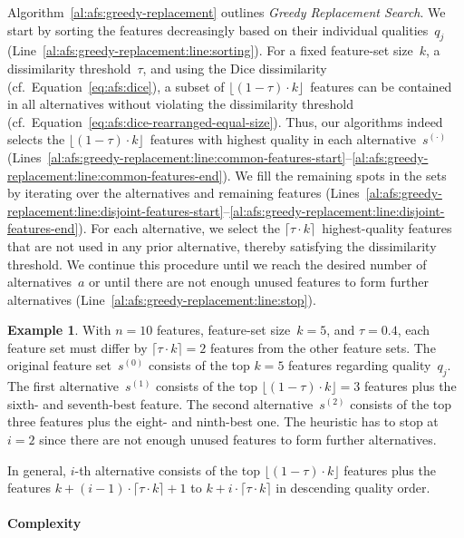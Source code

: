 \documentclass{article}
\theoremstyle{definition}
\newtheorem{example}{Example}
\begin{document}
Algorithm~\ref{al:afs:greedy-replacement} outlines \emph{Greedy Replacement Search}.
We start by sorting the features decreasingly based on their individual qualities~$q_j$ (Line~\ref{al:afs:greedy-replacement:line:sorting}).
For a fixed feature-set size~$k$, a dissimilarity threshold~$\tau$, and using the Dice dissimilarity (cf.~Equation~\ref{eq:afs:dice}), a subset of $\lfloor (1 - \tau) \cdot k \rfloor$~features can be contained in all alternatives without violating the dissimilarity threshold (cf.~Equation~\ref{eq:afs:dice-rearranged-equal-size}).
Thus, our algorithms indeed selects the $\lfloor (1 - \tau) \cdot k \rfloor$~features with highest quality in each alternative~$s^{(\cdot)}$ (Lines~\ref{al:afs:greedy-replacement:line:common-features-start}--\ref{al:afs:greedy-replacement:line:common-features-end}).
We fill the remaining spots in the sets by iterating over the alternatives and remaining features (Lines~\ref{al:afs:greedy-replacement:line:disjoint-features-start}--\ref{al:afs:greedy-replacement:line:disjoint-features-end}).
For each alternative, we select the $\lceil \tau \cdot k \rceil$~highest-quality features that are not used in any prior alternative, thereby satisfying the dissimilarity threshold.
We continue this procedure until we reach the desired number of alternatives~$a$ or until there are not enough unused features to form further alternatives (Line~\ref{al:afs:greedy-replacement:line:stop}).
%
\begin{example}
With $n=10$ features, feature-set size~$k=5$, and $\tau=0.4$, each feature set must differ by $\lceil \tau \cdot k \rceil = 2$ features from the other feature sets.
The original feature set~$s^{(0)}$ consists of the top $k=5$ features regarding quality~$q_j$.
The first alternative~$s^{(1)}$ consists of the top $\lfloor (1 - \tau) \cdot k \rfloor = 3$ features plus the sixth- and seventh-best feature.
The second alternative~$s^{(2)}$ consists of the top three features plus the eight- and ninth-best one.
The heuristic has to stop at $i=2$ since there are not enough unused features to form further alternatives.
\label{ex:afs:greedy-replacement:algorithm}
\end{example}
%
In general, $i$-th alternative consists of the top $\lfloor (1 - \tau) \cdot k \rfloor$ features plus the features $k + (i-1) \cdot \lceil \tau \cdot k \rceil + 1$ to $k + i \cdot \lceil \tau \cdot k \rceil$ in descending quality order.

\paragraph{Complexity}
\end{document}
